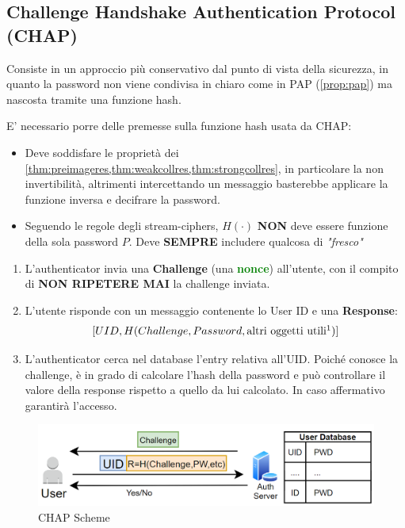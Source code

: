 \subsection{Challenge Handshake Authentication Protocol (CHAP)}
Consiste in un approccio più conservativo dal punto di vista della sicurezza, in quanto la password non viene condivisa in chiaro come in PAP (\cref{prop:pap}) ma nascosta tramite una funzione hash.
\begin{remark}
E' necessario porre delle premesse sulla funzione hash usata da CHAP:
\end{remark}
\begin{itemize}
    \item Deve soddisfare le proprietà dei \cref{thm:preimageres,thm:weakcollres,thm:strongcollres}, in particolare la non invertibilità, altrimenti intercettando un messaggio basterebbe applicare la funzione inversa e decifrare la password.
    \item Seguendo le regole degli stream-ciphers, $H(\cdot)$ \textbf{NON} deve essere funzione della sola password $P$. Deve \textbf{SEMPRE} includere qualcosa di \textit{"fresco"}\footnotemark
\end{itemize}
\begin{proposition}\label{prop:chap}
\begin{enumerate}
    \item L'authenticator invia una \textbf{Challenge} (una \textbf{\textcolor{green}{nonce}}) all'utente, con il compito di \textbf{NON RIPETERE MAI} la challenge inviata.
    \item L'utente risponde con un messaggio contenente lo User ID e una \textbf{Response}:
    \[[UID,H(Challenge, Password, \text{altri oggetti utili}\footnotemark)]\]
    \item L'authenticator cerca nel database l'entry relativa all'UID. Poiché conosce la challenge, è in grado di calcolare l'hash della password e può controllare il valore della response rispetto a quello da lui calcolato. In caso affermativo garantirà l’accesso.
\end{enumerate}
\end{proposition}
\begin{figure}[ht]
    \centering
    \includegraphics[width=\linewidth]{image/chap.png}
    \caption{CHAP Scheme}
    \label{fig:chap}
\end{figure}
